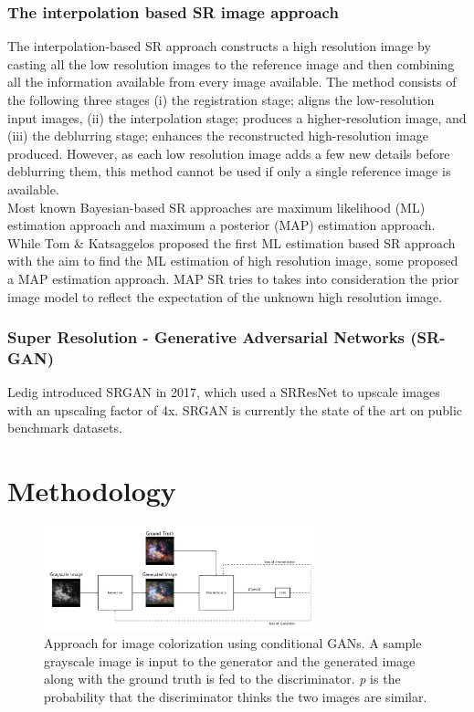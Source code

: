 \documentclass[10pt,twocolumn,letterpaper]{article}
\begin{document}
\subsubsection{The interpolation based SR image approach}
\hspace*{0.167 in} The interpolation-based SR approach constructs a high resolution image by casting all the low resolution images to the reference image and then combining all the information available from every image available.
The method consists of the following three stages
(i) the registration stage; aligns the low-resolution input images,
(ii) the interpolation stage; produces a higher-resolution image, and
(iii) the deblurring stage; enhances the reconstructed high-resolution image produced. However, as each low resolution image adds a few new details before deblurring them, this method cannot be used if only a single reference image is available.\\
\hspace*{0.167 in} Most known Bayesian-based SR approaches are maximum likelihood (ML) estimation approach  and maximum a posterior (MAP) estimation approach. While Tom \& Katsaggelos \cite{Brian1996ML} proposed the first ML estimation based SR approach with the aim to find the ML estimation of high resolution image, some proposed a MAP estimation approach. MAP SR tries to takes into consideration the prior image model to reflect the expectation of the unknown high resolution image.
\subsubsection{Super Resolution - Generative Adversarial Networks (SR-GAN)}
\hspace*{0.167 in}Ledig \etal\cite{ledig2017photorealistic} introduced SRGAN in 2017, which used a SRResNet to upscale images with an upscaling factor of 4x. SRGAN is currently the state of the art on public benchmark datasets.
\section{Methodology}
     \begin{figure}[!htb]
        \centering
        \includegraphics[width=0.7\textwidth]{figures/gan_visualization.pdf}
        \caption{Approach for image colorization using conditional GANs. A sample grayscale image is input to the generator and the generated image along with the ground truth is fed to the discriminator. \textit{p} is the probability that the discriminator thinks the two images are similar.}
        \label{fig:gan_visualization}
    \end{figure}
\end{document}
